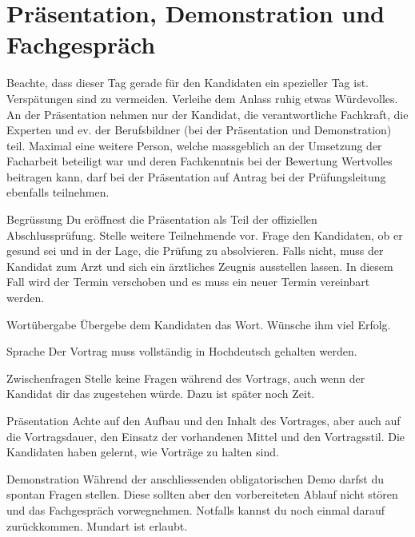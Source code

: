 \section{Präsentation, Demonstration und Fachgespräch}
Beachte, dass dieser Tag gerade für den Kandidaten ein spezieller Tag ist. Verspätungen sind zu vermeiden. Verleihe dem Anlass ruhig etwas Würdevolles. An der Präsentation nehmen nur der Kandidat, die verantwortliche Fachkraft, die Experten und ev. der Berufsbildner (bei der Präsentation und Demonstration) teil. Maximal eine weitere Person, welche massgeblich an der Umsetzung der Facharbeit beteiligt war und deren Fachkenntnis bei der Bewertung Wertvolles beitragen kann, darf bei der Präsentation auf Antrag bei der Prüfungsleitung ebenfalls teilnehmen.

\begin{taskitem}{Begrüssung}
  Du eröffnest die Präsentation als Teil der offiziellen Abschlussprüfung. Stelle weitere Teilnehmende vor. Frage den Kandidaten, ob er gesund sei und in der Lage, die Prüfung zu absolvieren. Falls nicht, muss der Kandidat zum Arzt und sich ein ärztliches Zeugnis ausstellen lassen. In diesem Fall wird der Termin verschoben und es muss ein neuer Termin vereinbart werden.
\end{taskitem}
\begin{taskitemwithoutcomment}{Wortübergabe}
  Übergebe dem Kandidaten das Wort. Wünsche ihm viel Erfolg.
\end{taskitemwithoutcomment}
\begin{taskitem}{Sprache}
  Der Vortrag muss vollständig in Hochdeutsch gehalten werden.
\end{taskitem}
\begin{taskitemwithoutcomment}{Zwischenfragen}
  Stelle keine Fragen während des Vortrags, auch wenn der Kandidat dir das zugestehen würde. Dazu ist später noch Zeit.
\end{taskitemwithoutcomment}
\begin{taskitem}{Präsentation}
  Achte auf den Aufbau und den Inhalt des Vortrages, aber auch auf die Vortragsdauer, den Einsatz der vorhandenen Mittel und den Vortragsstil. Die Kandidaten haben gelernt, wie Vorträge zu halten sind.
\end{taskitem}
\begin{taskitem}{Demonstration}
  Während der anschliessenden obligatorischen Demo darfst du spontan Fragen stellen. Diese sollten aber den vorbereiteten Ablauf nicht stören und das Fachgespräch vorwegnehmen. Notfalls kannst du noch einmal darauf zurückkommen. Mundart ist erlaubt.
\end{taskitem}
